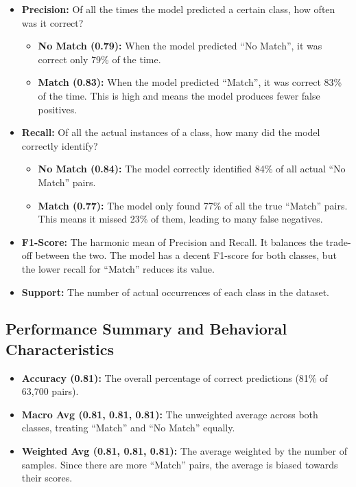 \begin{itemize}
    \item \textbf{Precision:} Of all the times the model predicted a certain class, how often was it correct?
          \begin{itemize}
              \item \textbf{No Match (0.79):} When the model predicted ``No Match'', it was correct only 79\% of the time.
              \item \textbf{Match (0.83):} When the model predicted ``Match'', it was correct 83\% of the time. This is high and means the model produces fewer false positives.
          \end{itemize}

    \item \textbf{Recall:} Of all the actual instances of a class, how many did the model correctly identify?
          \begin{itemize}
              \item \textbf{No Match (0.84):} The model correctly identified 84\% of all actual ``No Match'' pairs.
              \item \textbf{Match (0.77):} The model only found 77\% of all the true ``Match'' pairs. This means it missed 23\% of them, leading to many false negatives.
          \end{itemize}

    \item \textbf{F1-Score:} The harmonic mean of Precision and Recall. It balances the trade-off between the two. The model has a decent F1-score for both classes, but the lower recall for ``Match'' reduces its value.

    \item \textbf{Support:} The number of actual occurrences of each class in the dataset.
\end{itemize}

\subsection{Performance Summary and Behavioral Characteristics}

\begin{itemize}
    \item \textbf{Accuracy (0.81):} The overall percentage of correct predictions (81\% of 63,700 pairs).
    \item \textbf{Macro Avg (0.81, 0.81, 0.81):} The unweighted average across both classes, treating ``Match'' and ``No Match'' equally.
    \item \textbf{Weighted Avg (0.81, 0.81, 0.81):} The average weighted by the number of samples. Since there are more ``Match'' pairs, the average is biased towards their scores.
\end{itemize}


